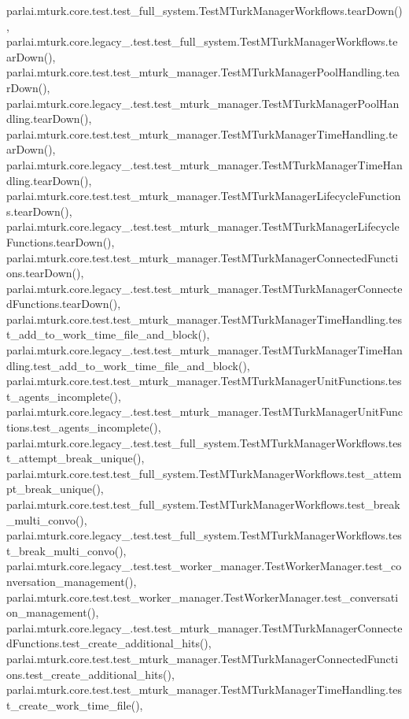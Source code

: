 parlai.\+mturk.\+core.\+test.\+test\+\_\+full\+\_\+system.\+Test\+M\+Turk\+Manager\+Workflows.\+tear\+Down(), parlai.\+mturk.\+core.\+legacy\+\_.\+test.\+test\+\_\+full\+\_\+system.\+Test\+M\+Turk\+Manager\+Workflows.\+tear\+Down(), parlai.\+mturk.\+core.\+test.\+test\+\_\+mturk\+\_\+manager.\+Test\+M\+Turk\+Manager\+Pool\+Handling.\+tear\+Down(), parlai.\+mturk.\+core.\+legacy\+\_.\+test.\+test\+\_\+mturk\+\_\+manager.\+Test\+M\+Turk\+Manager\+Pool\+Handling.\+tear\+Down(), parlai.\+mturk.\+core.\+test.\+test\+\_\+mturk\+\_\+manager.\+Test\+M\+Turk\+Manager\+Time\+Handling.\+tear\+Down(), parlai.\+mturk.\+core.\+legacy\+\_.\+test.\+test\+\_\+mturk\+\_\+manager.\+Test\+M\+Turk\+Manager\+Time\+Handling.\+tear\+Down(), parlai.\+mturk.\+core.\+test.\+test\+\_\+mturk\+\_\+manager.\+Test\+M\+Turk\+Manager\+Lifecycle\+Functions.\+tear\+Down(), parlai.\+mturk.\+core.\+legacy\+\_.\+test.\+test\+\_\+mturk\+\_\+manager.\+Test\+M\+Turk\+Manager\+Lifecycle\+Functions.\+tear\+Down(), parlai.\+mturk.\+core.\+test.\+test\+\_\+mturk\+\_\+manager.\+Test\+M\+Turk\+Manager\+Connected\+Functions.\+tear\+Down(), parlai.\+mturk.\+core.\+legacy\+\_.\+test.\+test\+\_\+mturk\+\_\+manager.\+Test\+M\+Turk\+Manager\+Connected\+Functions.\+tear\+Down(), parlai.\+mturk.\+core.\+test.\+test\+\_\+mturk\+\_\+manager.\+Test\+M\+Turk\+Manager\+Time\+Handling.\+test\+\_\+add\+\_\+to\+\_\+work\+\_\+time\+\_\+file\+\_\+and\+\_\+block(), parlai.\+mturk.\+core.\+legacy\+\_.\+test.\+test\+\_\+mturk\+\_\+manager.\+Test\+M\+Turk\+Manager\+Time\+Handling.\+test\+\_\+add\+\_\+to\+\_\+work\+\_\+time\+\_\+file\+\_\+and\+\_\+block(), parlai.\+mturk.\+core.\+test.\+test\+\_\+mturk\+\_\+manager.\+Test\+M\+Turk\+Manager\+Unit\+Functions.\+test\+\_\+agents\+\_\+incomplete(), parlai.\+mturk.\+core.\+legacy\+\_.\+test.\+test\+\_\+mturk\+\_\+manager.\+Test\+M\+Turk\+Manager\+Unit\+Functions.\+test\+\_\+agents\+\_\+incomplete(), parlai.\+mturk.\+core.\+legacy\+\_.\+test.\+test\+\_\+full\+\_\+system.\+Test\+M\+Turk\+Manager\+Workflows.\+test\+\_\+attempt\+\_\+break\+\_\+unique(), parlai.\+mturk.\+core.\+test.\+test\+\_\+full\+\_\+system.\+Test\+M\+Turk\+Manager\+Workflows.\+test\+\_\+attempt\+\_\+break\+\_\+unique(), parlai.\+mturk.\+core.\+test.\+test\+\_\+full\+\_\+system.\+Test\+M\+Turk\+Manager\+Workflows.\+test\+\_\+break\+\_\+multi\+\_\+convo(), parlai.\+mturk.\+core.\+legacy\+\_.\+test.\+test\+\_\+full\+\_\+system.\+Test\+M\+Turk\+Manager\+Workflows.\+test\+\_\+break\+\_\+multi\+\_\+convo(), parlai.\+mturk.\+core.\+legacy\+\_.\+test.\+test\+\_\+worker\+\_\+manager.\+Test\+Worker\+Manager.\+test\+\_\+conversation\+\_\+management(), parlai.\+mturk.\+core.\+test.\+test\+\_\+worker\+\_\+manager.\+Test\+Worker\+Manager.\+test\+\_\+conversation\+\_\+management(), parlai.\+mturk.\+core.\+legacy\+\_.\+test.\+test\+\_\+mturk\+\_\+manager.\+Test\+M\+Turk\+Manager\+Connected\+Functions.\+test\+\_\+create\+\_\+additional\+\_\+hits(), parlai.\+mturk.\+core.\+test.\+test\+\_\+mturk\+\_\+manager.\+Test\+M\+Turk\+Manager\+Connected\+Functions.\+test\+\_\+create\+\_\+additional\+\_\+hits(), parlai.\+mturk.\+core.\+test.\+test\+\_\+mturk\+\_\+manager.\+Test\+M\+Turk\+Manager\+Time\+Handling.\+test\+\_\+create\+\_\+work\+\_\+time\+\_\+file(), 